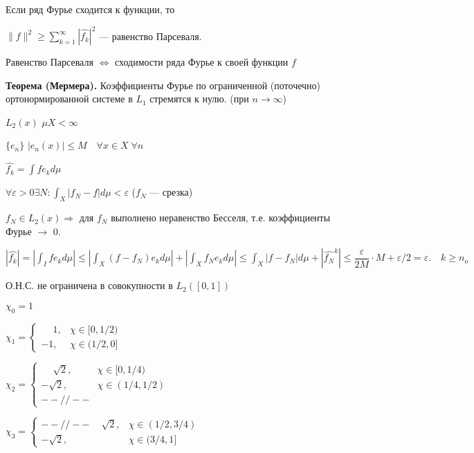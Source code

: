 Если ряд Фурье сходится к функции, то

$\|f\|^2 \geqslant \sum_{k=1}^\infty |\hat{f_k}|^2$ --- равенство
Парсеваля.

%
%
%
%
%
%
%
%
%
%
%
Равенство Парсеваля $\Leftrightarrow$ сходимости ряда Фурье к
своей функции $f$

\textbf{Теорема (Мермера).} \quad Коэффициенты Фурье по
ограниченной (поточечно) ортонормированной системе в $L_1$
стремятся к нулю. (при $n \rightarrow \infty$)

$L_2(x)$ $\mu X < \infty$

$\{e_n\}$ $|e_n(x)| \leqslant M \quad \forall x \in X \; \forall
n$

$\hat{f_k} = \int f e_k d \mu$

$\forall \varepsilon > 0 \exists N: \int_X |f_N - f| d \mu <
\varepsilon$ ($f_N$ --- срезка)

$f_N \in L_2(x) \Rightarrow $ для  $f_N$ выполнено неравенство
Бесселя, т.е. коэффициенты Фурье $\rightarrow$ 0.

$|\hat{f_k}| = |\int_I f e_k d \mu| \leqslant |\int_X (f - f_N)e_k
d \mu| + |\int_X f_N e_k d \mu| \leqslant \int_X |f - f_N| d \mu +
|\hat{f_N}^k| \leqslant \dfrac{\varepsilon}{2M}\cdot M +
\varepsilon/2 = \varepsilon. \quad k \geqslant n_o$

О.Н.С. не ограничена в совокупности в $L_2([0,1])$


 $\chi_0 = 1$

$\chi_1 =
\begin{cases}
\phantom{-}1, &\text{$\chi \in [0, 1/2)$}\\
 -1,&\text{$\chi \in (1/2,0]$}
\end{cases} $

$\chi_2 =
\begin{cases}
\phantom{-}\sqrt{2}, &\text{$\chi \in [0, 1/4)$}\\
-\sqrt{2}, &\text{$\chi \in (1/4, 1/2)$}\\
 -- // --
\end{cases} $

$\chi_3 =
\begin{cases}
-- // --
\phantom{-}\sqrt{2}, &\text{$\chi \in (1/2, 3/4)$}\\
 - \sqrt{2},&\text{$\chi \in (3/4,1]$}
\end{cases} $


